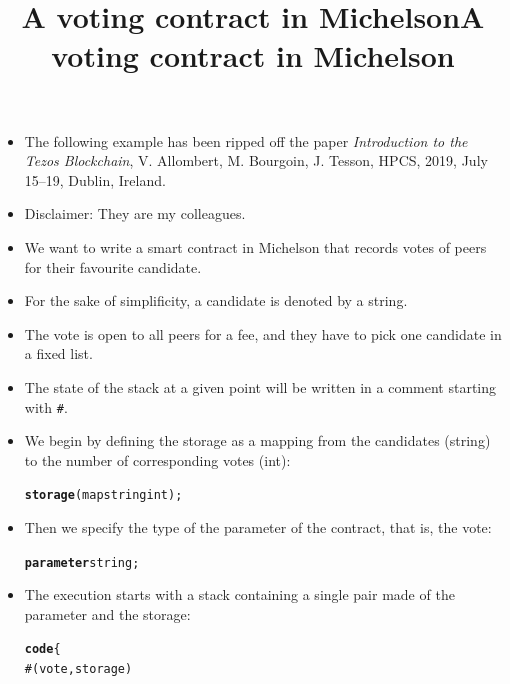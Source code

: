 \documentclass[wide]{slides}
\begin{document}
\begin{slide}
  \title{A voting contract in Michelson}

  \begin{itemize}

    \item The following example has been ripped off the paper
      \emph{Introduction to the Tezos Blockchain}, V. Allombert,
      M. Bourgoin, J. Tesson, HPCS, 2019, July 15–19, Dublin,
      Ireland.

    \item Disclaimer: They are my colleagues.

    \item We want to write a smart contract in Michelson that records
      votes of peers for their favourite candidate.

    \item For the sake of simplificity, a candidate is denoted by a
      string.

    \item The vote is open to all peers for a fee, and they have to
      pick one candidate in a fixed list.

    \item The state of the stack at a given point will be written in a
      comment starting with \texttt{\#}.

  \end{itemize}

\end{slide}

\begin{slide}
  \title{A voting contract in Michelson}

  \begin{itemize}

    \item We begin by defining the storage as a mapping from the
      candidates (\textsf{string}) to the number of corresponding
      votes (\textsf{int}):
      \begin{alltt}
        \textbf{storage} (map string int);
      \end{alltt}

    \item Then we specify the type of the parameter of the contract,
       that is, the vote:
      \begin{alltt}
        \textbf{parameter} string;
      \end{alltt}

    \item The execution starts with a stack containing a single pair
      made of the parameter and the storage:
      \begin{alltt}
        \textbf{code} \{
          # (vote, storage)
      \end{alltt}

  \end{itemize}

\end{slide}
\end{document}
